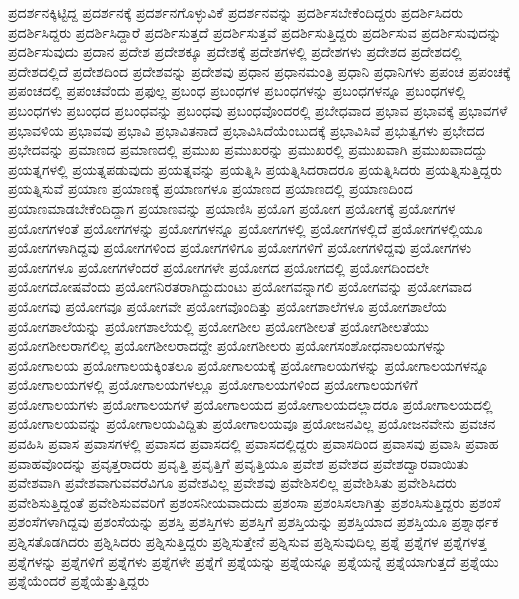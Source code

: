 {ಪ್ರದರ್ಶನಕ್ಕಿಟ್ಟಿದ್ದ
ಪ್ರದರ್ಶನಕ್ಕೆ
ಪ್ರದರ್ಶನಗೊಳ್ಳುವಿಕೆ
ಪ್ರದರ್ಶನವನ್ನು
ಪ್ರದರ್ಶಿಸಬೇಕೆಂದಿದ್ದರು
ಪ್ರದರ್ಶಿಸಿದರು
ಪ್ರದರ್ಶಿಸಿದ್ದರು
ಪ್ರದರ್ಶಿಸಿದ್ದಾರೆ
ಪ್ರದರ್ಶಿಸುತ್ತದೆ
ಪ್ರದರ್ಶಿಸುತ್ತವೆ
ಪ್ರದರ್ಶಿಸುತ್ತಿದ್ದರು
ಪ್ರದರ್ಶಿಸುವ
ಪ್ರದರ್ಶಿಸುವುದನ್ನು
ಪ್ರದರ್ಶಿಸುವುದು
ಪ್ರದಾನ
ಪ್ರದೇಶ
ಪ್ರದೇಶಕ್ಕೂ
ಪ್ರದೇಶಕ್ಕೆ
ಪ್ರದೇಶಗಳಲ್ಲಿ
ಪ್ರದೇಶಗಳು
ಪ್ರದೇಶದ
ಪ್ರದೇಶದಲ್ಲಿ
ಪ್ರದೇಶದಲ್ಲಿದೆ
ಪ್ರದೇಶದಿಂದ
ಪ್ರದೇಶವನ್ನು
ಪ್ರದೇಶವು
ಪ್ರಧಾನ
ಪ್ರಧಾನಮಂತ್ರಿ
ಪ್ರಧಾನಿ
ಪ್ರಧಾನಿಗಳು
ಪ್ರಪಂಚ
ಪ್ರಪಂಚಕ್ಕೆ
ಪ್ರಪಂಚದಲ್ಲಿ
ಪ್ರಪಂಚವೆಂದು
ಪ್ರಫುಲ್ಲ
ಪ್ರಬಂಧ
ಪ್ರಬಂಧಗಳ
ಪ್ರಬಂಧಗಳನ್ನು
ಪ್ರಬಂಧಗಳನ್ನೂ
ಪ್ರಬಂಧಗಳಲ್ಲಿ
ಪ್ರಬಂಧಗಳು
ಪ್ರಬಂಧದ
ಪ್ರಬಂಧವನ್ನು
ಪ್ರಬಂಧವು
ಪ್ರಬಂಧವೊಂದರಲ್ಲಿ
ಪ್ರಬೇಧವಾದ
ಪ್ರಭಾವ
ಪ್ರಭಾವಕ್ಕೆ
ಪ್ರಭಾವಗಳೆ
ಪ್ರಭಾವಳಿಯ
ಪ್ರಭಾವವು
ಪ್ರಭಾವಿ
ಪ್ರಭಾವಿತನಾದೆ
ಪ್ರಭಾವಿಸಿದೆಯೆಂಬುದಕ್ಕೆ
ಪ್ರಭಾವಿಸಿವೆ
ಪ್ರಭುತ್ವಗಳು
ಪ್ರಭೇದದ
ಪ್ರಭೇದವನ್ನು
ಪ್ರಮಾಣದ
ಪ್ರಮಾಣದಲ್ಲಿ
ಪ್ರಮುಖ
ಪ್ರಮುಖರನ್ನು
ಪ್ರಮುಖರಲ್ಲಿ
ಪ್ರಮುಖವಾಗಿ
ಪ್ರಮುಖವಾದದ್ದು
ಪ್ರಯತ್ನಗಳಲ್ಲಿ
ಪ್ರಯತ್ನಪಡುವುದು
ಪ್ರಯತ್ನವನ್ನು
ಪ್ರಯತ್ನಿಸಿ
ಪ್ರಯತ್ನಿಸಿದರಾದರೂ
ಪ್ರಯತ್ನಿಸಿದರು
ಪ್ರಯತ್ನಿಸುತ್ತಿದ್ದರು
ಪ್ರಯತ್ನಿಸುವೆ
ಪ್ರಯಾಣ
ಪ್ರಯಾಣಕ್ಕೆ
ಪ್ರಯಾಣಗಳೂ
ಪ್ರಯಾಣದ
ಪ್ರಯಾಣದಲ್ಲಿ
ಪ್ರಯಾಣದಿಂದ
ಪ್ರಯಾಣಮಾಡಬೇಕೆಂದಿದ್ದಾಗ
ಪ್ರಯಾಣವನ್ನು
ಪ್ರಯಾಣಿಸಿ
ಪ್ರಯೊಗ
ಪ್ರಯೋಗ
ಪ್ರಯೋಗಕ್ಕೆ
ಪ್ರಯೋಗಗಳ
ಪ್ರಯೋಗಗಳಂತೆ
ಪ್ರಯೋಗಗಳನ್ನು
ಪ್ರಯೋಗಗಳನ್ನೂ
ಪ್ರಯೋಗಗಳಲ್ಲಿ
ಪ್ರಯೋಗಗಳಲ್ಲಿದೆ
ಪ್ರಯೋಗಗಳಲ್ಲಿಯೂ
ಪ್ರಯೋಗಗಳಾಗಿದ್ದವು
ಪ್ರಯೋಗಗಳಿಂದ
ಪ್ರಯೋಗಗಳಿಗೂ
ಪ್ರಯೋಗಗಳಿಗೆ
ಪ್ರಯೋಗಗಳಿದ್ದವು
ಪ್ರಯೋಗಗಳು
ಪ್ರಯೋಗಗಳೂ
ಪ್ರಯೋಗಗಳೆಂದರೆ
ಪ್ರಯೋಗಗಳೇ
ಪ್ರಯೋಗದ
ಪ್ರಯೋಗದಲ್ಲಿ
ಪ್ರಯೋಗದಿಂದಲೇ
ಪ್ರಯೋಗದೋಷವೆಂದು
ಪ್ರಯೋಗನಿರತರಾಗಿದ್ದುದುಂಟು
ಪ್ರಯೋಗವನ್ನಾಗಲಿ
ಪ್ರಯೋಗವನ್ನು
ಪ್ರಯೋಗವಾದ
ಪ್ರಯೋಗವು
ಪ್ರಯೋಗವೂ
ಪ್ರಯೋಗವೇ
ಪ್ರಯೋಗವೊಂದಿತ್ತು
ಪ್ರಯೋಗಶಾಲೆಗಳೂ
ಪ್ರಯೋಗಶಾಲೆಯ
ಪ್ರಯೋಗಶಾಲೆಯನ್ನು
ಪ್ರಯೋಗಶಾಲೆಯಲ್ಲಿ
ಪ್ರಯೋಗಶೀಲ
ಪ್ರಯೋಗಶೀಲತೆ
ಪ್ರಯೋಗಶೀಲತೆಯು
ಪ್ರಯೋಗಶೀಲರಾಗಲಿಲ್ಲ
ಪ್ರಯೋಗಶೀಲರಾದದ್ದೇ
ಪ್ರಯೋಗಶೀಲರು
ಪ್ರಯೋಗಸಂಶೋಧನಾಲಯಗಳನ್ನು
ಪ್ರಯೋಗಾಲಯ
ಪ್ರಯೋಗಾಲಯಕ್ಕಿಂತಲೂ
ಪ್ರಯೋಗಾಲಯಕ್ಕೆ
ಪ್ರಯೋಗಾಲಯಗಳನ್ನು
ಪ್ರಯೋಗಾಲಯಗಳನ್ನೂ
ಪ್ರಯೋಗಾಲಯಗಳಲ್ಲಿ
ಪ್ರಯೋಗಾಲಯಗಳಲ್ಲೂ
ಪ್ರಯೋಗಾಲಯಗಳಿಂದ
ಪ್ರಯೋಗಾಲಯಗಳಿಗೆ
ಪ್ರಯೋಗಾಲಯಗಳು
ಪ್ರಯೋಗಾಲಯಗಳೆ
ಪ್ರಯೋಗಾಲಯದ
ಪ್ರಯೋಗಾಲಯದಲ್ಲಾದರೂ
ಪ್ರಯೋಗಾಲಯದಲ್ಲಿ
ಪ್ರಯೋಗಾಲಯವನ್ನು
ಪ್ರಯೋಗಾಲಯವಿದ್ದಿತು
ಪ್ರಯೋಗಾಲಯವೂ
ಪ್ರಯೋಜನವಿಲ್ಲ
ಪ್ರಯೋಜನವೇನು
ಪ್ರವಚನ
ಪ್ರವಹಿಸಿ
ಪ್ರವಾಸ
ಪ್ರವಾಸಗಳಲ್ಲಿ
ಪ್ರವಾಸದ
ಪ್ರವಾಸದಲ್ಲಿ
ಪ್ರವಾಸದಲ್ಲಿದ್ದರು
ಪ್ರವಾಸದಿಂದ
ಪ್ರವಾಸವು
ಪ್ರವಾಸಿ
ಪ್ರವಾಹ
ಪ್ರವಾಹವೊಂದನ್ನು
ಪ್ರವೃತ್ತರಾದರು
ಪ್ರವೃತ್ತಿ
ಪ್ರವೃತ್ತಿಗೆ
ಪ್ರವೃತ್ತಿಯೂ
ಪ್ರವೇಶ
ಪ್ರವೇಶದ
ಪ್ರವೇಶದ್ವಾರವಾಯಿತು
ಪ್ರವೇಶವಾಗಿ
ಪ್ರವೇಶವಾಗುವವರೆವಿಗೂ
ಪ್ರವೇಶವಿಲ್ಲ
ಪ್ರವೇಶವು
ಪ್ರವೇಶಿಸಲಿಲ್ಲ
ಪ್ರವೇಶಿಸಿತು
ಪ್ರವೇಶಿಸಿದರು
ಪ್ರವೇಶಿಸುತ್ತಿದ್ದಂತೆ
ಪ್ರವೇಶಿಸುವವರಿಗೆ
ಪ್ರಶಂಸನೀಯವಾದುದು
ಪ್ರಶಂಸಾ
ಪ್ರಶಂಸಿಸಲಾಗಿತ್ತು
ಪ್ರಶಂಸಿಸುತ್ತಿದ್ದರು
ಪ್ರಶಂಸೆ
ಪ್ರಶಂಸೆಗಳಾಗಿದ್ದವು
ಪ್ರಶಂಸೆಯನ್ನು
ಪ್ರಶಸ್ತಿ
ಪ್ರಶಸ್ತಿಗಳು
ಪ್ರಶಸ್ತಿಗೆ
ಪ್ರಶಸ್ತಿಯನ್ನು
ಪ್ರಶಸ್ತಿಯಾದ
ಪ್ರಶಸ್ತಿಯೂ
ಪ್ರಶ್ನಾರ್ಥಕ
ಪ್ರಶ್ನಿಸತೊಡಗಿದರು
ಪ್ರಶ್ನಿಸಿದರು
ಪ್ರಶ್ನಿಸುತ್ತಿದ್ದರು
ಪ್ರಶ್ನಿಸುತ್ತೇನೆ
ಪ್ರಶ್ನಿಸುವ
ಪ್ರಶ್ನಿಸುವುದಿಲ್ಲ
ಪ್ರಶ್ನೆ
ಪ್ರಶ್ನೆಗಳ
ಪ್ರಶ್ನೆಗಳತ್ತ
ಪ್ರಶ್ನೆಗಳನ್ನು
ಪ್ರಶ್ನೆಗಳಿಗೆ
ಪ್ರಶ್ನೆಗಳು
ಪ್ರಶ್ನೆಗಳೇ
ಪ್ರಶ್ನೆಗೆ
ಪ್ರಶ್ನೆಯನ್ನು
ಪ್ರಶ್ನೆಯನ್ನೂ
ಪ್ರಶ್ನೆಯನ್ನೆ
ಪ್ರಶ್ನೆಯಾಗುತ್ತದೆ
ಪ್ರಶ್ನೆಯು
ಪ್ರಶ್ನೆಯೆಂದರೆ
ಪ್ರಶ್ನೆಯೆತ್ತುತ್ತಿದ್ದರು
}
